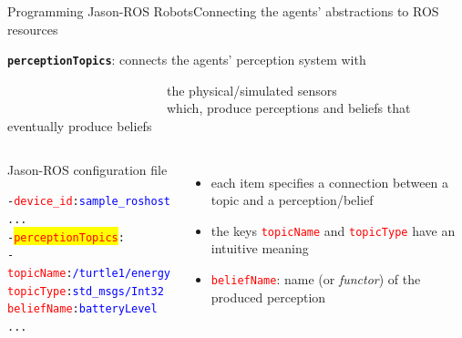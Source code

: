 \documentclass[compress]{beamer}
\newcommand{\yamlkey}[1]{\textcolor{red}{\texttt{#1}}}
\newcommand{\yamlvalue}[1]{\textcolor{blue}{\texttt{#1}}}
\begin{document}
\begin{frame}[fragile]{Programming Jason-ROS Robots}{Connecting the agents' abstractions to ROS resources}


\footnotesize
\texttt{{\bf perceptionTopics}}: %
connects the agents' perception system with\\ 

\vspace{-.47cm}

\ \ \ \ \ \ \ \ \ \ \ \ \ \ \ \ \ \ \ \ \ \ \ \ \ the physical/simulated sensors\\

\vspace{-.5cm}
\ \ \ \ \ \ \ \ \ \ \ \ \ \ \ \ \ \ \ \ \ \ \ \ \ {\tiny which, produce perceptions and beliefs that eventually produce beliefs}

\vspace{.5cm}

\begin{columns}
 
\begin{block}{{\scriptsize Jason-ROS configuration file}}
\scriptsize
  \begin{alltt}
- \yamlkey{device_id}: \yamlvalue{sample_roshost}    
     ...
  - \colorbox{yellow}{\yamlkey{perceptionTopics}}:     
    - \yamlkey{topicName}: \yamlvalue{/turtle1/energy}
      \yamlkey{topicType}: \yamlvalue{std_msgs/Int32}
      \yamlkey{beliefName}: \yamlvalue{batteryLevel} 
     ...
  \end{alltt}
\end{block}  

 \scriptsize
 \begin{itemize}
  \item each item specifies a connection between a topic and a perception/belief
  \item the keys \yamlkey{topicName} and \yamlkey{topicType} have an intuitive meaning   
  \item \yamlkey{beliefName}: name (or \textit{functor}) of the produced perception  
 \end{itemize}


\end{columns}
\end{frame}
\end{document}
